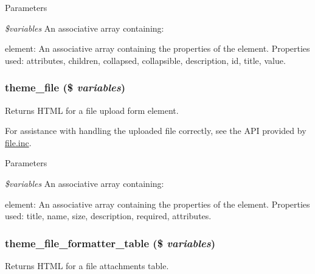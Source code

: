 \begin{DoxyParams}{Parameters}
\item[{\em \$variables}]An associative array containing:
\begin{DoxyItemize}
\item element: An associative array containing the properties of the element. Properties used: attributes, children, collapsed, collapsible, description, id, title, value. 
\end{DoxyItemize}\end{DoxyParams}
\hypertarget{group__themeable_ga4c1b5b57f578c1441e27f53733074af8}{
\subsubsection[{theme\_\-file}]{\setlength{\rightskip}{0pt plus 5cm}theme\_\-file (\$ {\em variables})}}
\label{group__themeable_ga4c1b5b57f578c1441e27f53733074af8}
Returns HTML for a file upload form element.

For assistance with handling the uploaded file correctly, see the API provided by \hyperlink{file_8inc}{file.inc}.


\begin{DoxyParams}{Parameters}
\item[{\em \$variables}]An associative array containing:
\begin{DoxyItemize}
\item element: An associative array containing the properties of the element. Properties used: title, name, size, description, required, attributes. 
\end{DoxyItemize}\end{DoxyParams}
\hypertarget{group__themeable_ga4c35503833fe7ebd0d012e2da75fd4e1}{
\subsubsection[{theme\_\-file\_\-formatter\_\-table}]{\setlength{\rightskip}{0pt plus 5cm}theme\_\-file\_\-formatter\_\-table (\$ {\em variables})}}
\label{group__themeable_ga4c35503833fe7ebd0d012e2da75fd4e1}
Returns HTML for a file attachments table.


